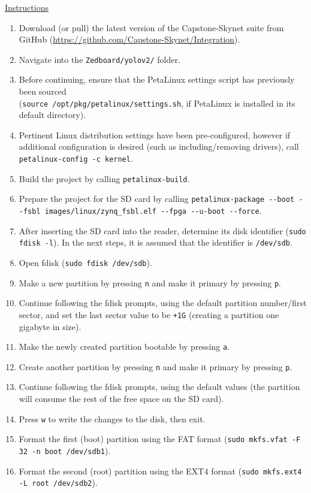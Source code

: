 \documentclass[10pt,letterpaper]{article}
\begin{document}
\underline{Instructions}
\begin{enumerate}
\item Download (or pull) the latest version of the Capstone-Skynet suite from GitHub (\url{https://github.com/Capstone-Skynet/Integration}).
\item Navigate into the \texttt{Zedboard/yolov2/} folder. 
\item Before continuing, ensure that the PetaLinux settings script has previously been sourced\\ (\texttt{source /opt/pkg/petalinux/settings.sh}, if PetaLinux is installed in its default directory).
\item Pertinent Linux distribution settings have been pre-configured, however if additional configuration is desired (such as including/removing drivers), call \texttt{petalinux-config -c kernel}.
\item Build the project by calling \texttt{petalinux-build}.
\item Prepare the project for the SD card by calling \texttt{petalinux-package -{}-boot -{}-fsbl images/linux/zynq\_fsbl.elf -{}-fpga -{}-u-boot -{}-force}.
\item After inserting the SD card into the reader, determine its disk identifier (\texttt{sudo fdisk -l}). In the next steps, it is assumed that the identifier is \texttt{/dev/sdb}.
\item Open fdisk (\texttt{sudo fdisk /dev/sdb}).
\item Make a new partition by pressing \texttt{n} and make it primary by pressing \texttt{p}.
\item Continue following the fdisk prompts, using the default partition number/first sector, and set the last sector value to be \texttt{+1G} (creating a partition one gigabyte in size).
\item Make the newly created partition bootable by pressing \texttt{a}.
\item Create another partition by pressing \texttt{n} and make it primary by pressing \texttt{p}.
\item Continue following the fdisk prompts, using the default values (the partition will consume the rest of the free space on the SD card).
\item Press \texttt{w} to write the changes to the disk, then exit.
\item Format the first (boot) partition using the FAT format (\texttt{sudo mkfs.vfat -F 32 -n boot /dev/sdb1}).
\item Format the second (root) partition using the EXT4 format (\texttt{sudo mkfs.ext4 -L root /dev/sdb2}).

\end{enumerate}
\end{document}
